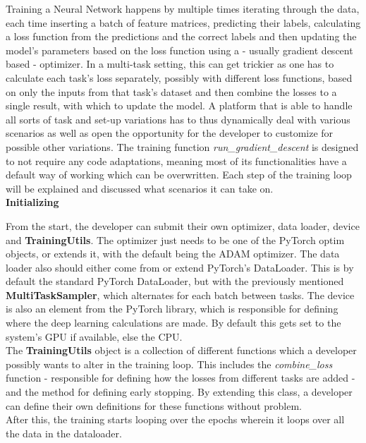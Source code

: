 Training a Neural Network happens by multiple times iterating through the data, each time inserting a batch of feature matrices, predicting their labels, calculating a loss function from the predictions and the correct labels and then updating the model's parameters based on the loss function using a - usually gradient descent based - optimizer. In a multi-task setting, this can get trickier as one has to calculate each task's loss separately, possibly with different loss functions, based on only the inputs from that task's dataset and then combine the losses to a single result, with which to update the model. A platform that is able to handle all sorts of task and set-up variations has to thus dynamically deal with various scenarios as well as open the opportunity for the developer to customize for possible other variations. The training function \textit{run\_gradient\_descent} is designed to not require any code adaptations, meaning most of its functionalities have a default way of working which can be overwritten. Each step of the training loop will be explained and discussed what scenarios it can take on. \\

\textbf{Initializing}

From the start, the developer can submit their own optimizer, data loader, device and \textbf{TrainingUtils}. The optimizer just needs to be one of the PyTorch optim objects, or extends it, with the default being the ADAM optimizer. The data loader also should either come from or extend PyTorch's DataLoader. This is by default the standard PyTorch DataLoader, but with the previously mentioned \textbf{MultiTaskSampler}, which alternates for each batch between tasks. The device is also an element from the PyTorch library, which is responsible for defining where the deep learning calculations are made. By default this gets set to the system's GPU if available, else the CPU. \\

The \textbf{TrainingUtils} object is a collection of different functions which a developer possibly wants to alter in the training loop. This includes the \textit{combine\_loss} function - responsible for defining how the losses from different tasks are added - and the method for defining early stopping. By extending this class, a developer can define their own definitions for these functions without problem. \\

After this, the training starts looping over the epochs wherein it loops over all the data in the dataloader. \\

